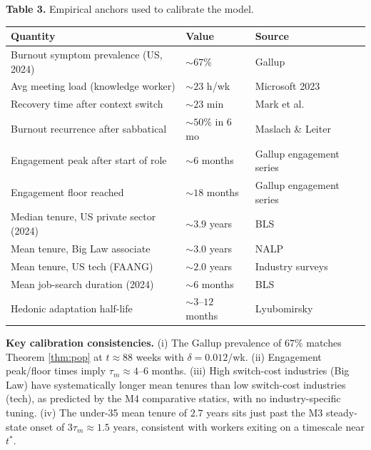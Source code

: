 \documentclass[11pt]{article}
\begin{document}
\begin{center}
\textbf{Table 3.} Empirical anchors used to calibrate the model.

\medskip
\begin{tabular}{lll}
\toprule
Quantity & Value & Source \\
\midrule
Burnout symptom prevalence (US, 2024)         & $\sim 67\%$            & Gallup \cite{gallup2024} \\
Avg meeting load (knowledge worker)           & $\sim 23$ h/wk         & Microsoft 2023 \\
Recovery time after context switch            & $\sim 23$ min          & Mark et al.\ \cite{mark2008} \\
Burnout recurrence after sabbatical           & $\sim 50\%$ in 6 mo    & Maslach \& Leiter \cite{maslach2016} \\
Engagement peak after start of role           & $\sim 6$ months        & Gallup engagement series \\
Engagement floor reached                      & $\sim 18$ months       & Gallup engagement series \\
Median tenure, US private sector (2024)       & $\sim 3.9$ years       & BLS \cite{bls2024} \\
Mean tenure, Big Law associate                & $\sim 3.0$ years       & NALP \\
Mean tenure, US tech (FAANG)                  & $\sim 2.0$ years       & Industry surveys \\
Mean job-search duration (2024)               & $\sim 6$ months        & BLS \cite{bls2024} \\
Hedonic adaptation half-life                  & $\sim 3$--$12$ months  & Lyubomirsky \cite{lyubomirsky2011} \\
\bottomrule
\end{tabular}
\end{center}

\medskip\noindent\textbf{Key calibration consistencies.} (i) The Gallup
prevalence of $67\%$ matches Theorem \ref{thm:pop} at $t \approx 88$ weeks
with $\delta = 0.012$/wk. (ii) Engagement peak/floor times imply
$\tau_m \approx 4$--$6$ months. (iii) High switch-cost industries (Big Law)
have systematically longer mean tenures than low switch-cost industries
(tech), as predicted by the M4 comparative statics, with no industry-specific
tuning. (iv) The under-35 mean tenure of $2.7$ years sits just past the M3
steady-state onset of $3\tau_m \approx 1.5$ years, consistent with workers
exiting on a timescale near $t^*$.
\end{document}
